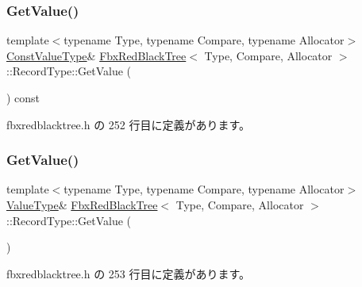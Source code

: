 \subsubsection{\texorpdfstring{Get\+Value()}{GetValue()}\hspace{0.1cm}{\footnotesize\ttfamily [1/2]}}
{\footnotesize\ttfamily template$<$typename Type, typename Compare, typename Allocator$>$ \\
\hyperlink{class_fbx_red_black_tree_a60ce913af196ee4cf886585363c4b0ca}{Const\+Value\+Type}\& \hyperlink{class_fbx_red_black_tree}{Fbx\+Red\+Black\+Tree}$<$ Type, Compare, Allocator $>$\+::Record\+Type\+::\+Get\+Value (\begin{DoxyParamCaption}{ }\end{DoxyParamCaption}) const\hspace{0.3cm}{\ttfamily [inline]}}



 fbxredblacktree.\+h の 252 行目に定義があります。

\mbox{\label{class_fbx_red_black_tree_1_1_record_type_a7c5822c8b6c41757eaafe32e37cfbdb4}} 
\subsubsection{\texorpdfstring{Get\+Value()}{GetValue()}\hspace{0.1cm}{\footnotesize\ttfamily [2/2]}}
{\footnotesize\ttfamily template$<$typename Type, typename Compare, typename Allocator$>$ \\
\hyperlink{class_fbx_red_black_tree_a178e34888fa8c0fab5a7527ab30a663c}{Value\+Type}\& \hyperlink{class_fbx_red_black_tree}{Fbx\+Red\+Black\+Tree}$<$ Type, Compare, Allocator $>$\+::Record\+Type\+::\+Get\+Value (\begin{DoxyParamCaption}{ }\end{DoxyParamCaption})\hspace{0.3cm}{\ttfamily [inline]}}



 fbxredblacktree.\+h の 253 行目に定義があります。

\mbox{\label{class_fbx_red_black_tree_1_1_record_type_a6749244cf93a46657d689bd51b67ed04}} 
